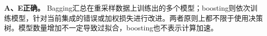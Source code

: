 \textbf{A、E正确。} Bagging汇总在重采样数据上训练出的多个模型；boosting则依次训练模型，针对当前集成的错误或加权损失进行改进。两者原则上都不限于使用决策树。模型数量增加不一定导致过拟合，boosting也不表示计算加速。
